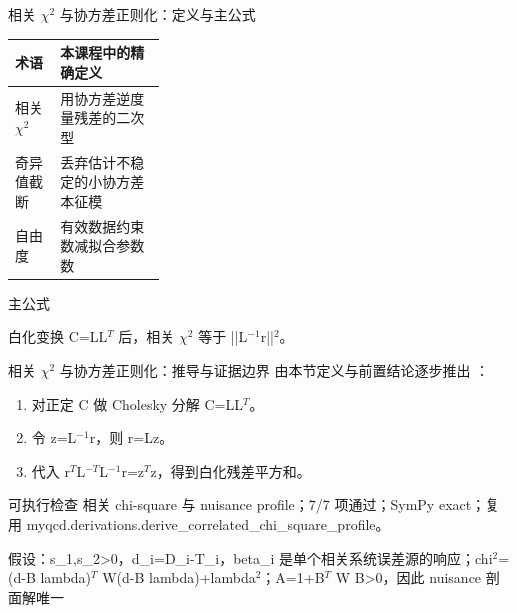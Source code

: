 \begin{frame}[t]{相关 \ensuremath{\chi}\ensuremath{^{2}} 与协方差正则化：定义与主公式}
\footnotesize\begin{tabularx}{\linewidth}{p{0.30\linewidth}Y}
\toprule 术语 & 本课程中的精确定义\\\midrule
{} 相关 \ensuremath{\chi}\ensuremath{^{2}} & 用协方差逆度量残差的二次型\\
 奇异值截断 & 丢弃估计不稳定的小协方差本征模\\
 自由度 & 有效数据约束数减拟合参数数\\
\bottomrule\end{tabularx}\vspace{0.15cm}
\begin{block}{ 主公式}\centering{}\end{block}
白化变换 C=LL\ensuremath{^{T}} 后，相关 \ensuremath{\chi}\ensuremath{^{2}} 等于 ||L\ensuremath{^{-1}}r||\ensuremath{^{2}}。
\end{frame}

\begin{frame}[t]{相关 \ensuremath{\chi}\ensuremath{^{2}} 与协方差正则化：推导与证据边界}
\footnotesize
{}\quad 由本节定义与前置结论逐步推出 ：
\begin{enumerate}
\item 对正定 C 做 Cholesky 分解 C=LL\ensuremath{^{T}}。
\item 令 z=L\ensuremath{^{-1}}r，则 r=Lz。
\item 代入 r\ensuremath{^{T}}L\ensuremath{^{-T}}L\ensuremath{^{-1}}r=z\ensuremath{^{T}}z，得到白化残差平方和。
\end{enumerate}\begin{block}{可执行检查}
\quad 相关 chi-square 与 nuisance profile；7/7 项通过；SymPy exact；复用 myqcd.derivations.derive\_correlated\_chi\_square\_profile。
\par\scriptsize 假设：s\_1,s\_2>0，d\_i=D\_i-T\_i，beta\_i 是单个相关系统误差源的响应；chi\ensuremath{^{2}}=(d-B lambda)\ensuremath{^{T}} W(d-B lambda)+lambda\ensuremath{^{2}}；A=1+B\ensuremath{^{T}} W B>0，因此 nuisance 剖面解唯一
\end{block}
\end{frame}

